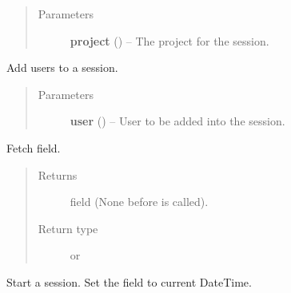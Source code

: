 \documentclass[letterpaper,10pt,english]{sphinxmanual}
\begin{document}
\begin{fulllineitems}
\begin{description}
\end{description}
\begin{quote}\begin{description}
\item[{Parameters}] \leavevmode
\textbf{project} ({\hyperref[models:models.Project]{}}) -- The project for the session.

\end{description}\end{quote}

\begin{fulllineitems}
\label{models:models.Session.AddUser}
Add users to a session.
\begin{quote}\begin{description}
\item[{Parameters}] \leavevmode
\textbf{user} ({\hyperref[models:models.User]{}}) -- User to be added into the session.

\end{description}\end{quote}

\end{fulllineitems}


\begin{fulllineitems}
\label{models:models.Session.GetLastChecked}
Fetch  field.
\begin{quote}\begin{description}
\item[{Returns}] \leavevmode
{} field (None before                   is called).

\item[{Return type}] \leavevmode
{} or 

\end{description}\end{quote}

\end{fulllineitems}


\begin{fulllineitems}
\label{models:models.Session.Start}
Start a session.
Set the  field to current DateTime.

\end{fulllineitems}


\end{fulllineitems}
\end{document}
